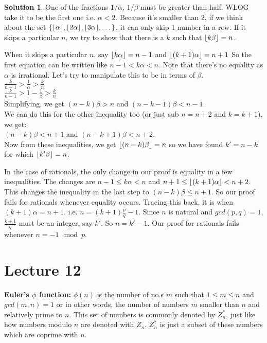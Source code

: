 \documentclass[a4paper,10pt]{article}
\theoremstyle{definition} %
\newtheorem*{solution}{Solution}
\DeclarePairedDelimiter\floor{\lfloor}{\rfloor} %
\begin{document}
    \begin{solution}
        One of the fractions $1/\alpha$, $1/\beta$ must be greater than half. WLOG take it
        to be the first one i.e. $\alpha < 2$. Because it's smaller than $2$, if we think about
        the set $\{\floor{\alpha}, \floor{2\alpha}, \floor{3\alpha}, \dots\}$, it can only skip
        1 number in a row. If it skips a particular $n$, we try to show that there is a $k$ 
        such that $\floor{k\beta} = n$.

        When it skips a particular $n$, say $\floor{k\alpha} = n-1$ and 
        $\floor{(k+1)\alpha} = n+1$
        So the first equation can be written like $n-1 < k\alpha < n$. Note that there's no equality
        as $\alpha$ is irrational. Let's try to manipulate this to be in terms of $\beta$. \\
        $\frac{k}{n-1} > \frac{1}{\alpha} > \frac{k}{n}$ \\
        $\frac{k}{n-1} > 1 - \frac{1}{\beta} > \frac{k}{n}$ \\
        Simplifying, we get $(n-k)\beta > n$ and $(n-k-1)\beta < n-1$. \\
        We can do this for the other inequality too (or just sub $n=n+2$ and $k=k+1$), we get: \\
        $(n-k)\beta < n+1$ and $(n-k+1)\beta < n+2$. \\
        Now from these inequalities, we get $\floor{(n-k)\beta} = n$ so we have found $k' = n-k$
        for which $\floor{k'\beta} = n$.

        In the case of rationals, the only change in our proof is equality in a few inequalities.
        The changes are $n-1 \leq k\alpha < n$ and $ n+1 \leq \floor{(k+1)\alpha} < n+2$.
        This changes the inequality in the last step to $(n-k)\beta \leq n+1$. So our proof
        fails for rationals whenever equality occurs. Tracing this back, it is when $(k+1)\alpha = n+1$.
        i.e. $n = (k+1)\frac{p}{q} - 1$. Since $n$ is natural and $gcd(p,q)=1$, $\frac{k+1}{q}$
        must be an integer, say $k'$. So $n = k' - 1$. Our proof for rationals fails 
        whenever $n = -1 \mod p$.

    \end{solution}

    \section{Lecture 12}

    \textbf{Euler's $\phi$ function: }$\phi(n)$ is the number of no.s $m$ such that
    $1 \leq m \leq n$ and $gcd(m,n) = 1$ or in other words, the number of numbers $m$ smaller than
    $n$ and relatively prime to $n$. This set of numbers is commonly denoted by $Z_n^*$, just
    like how numbers modulo $n$ are denoted with $Z_n$. $Z_n^*$ is just a subset of these numbers
    which are coprime with $n$.
\end{document}
